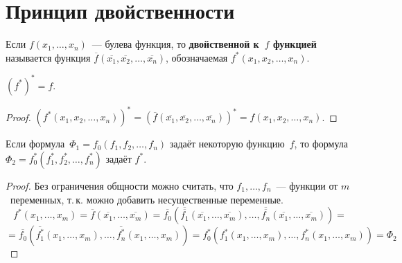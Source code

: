 \section{Принцип двойственности}
 Если $f(x_1, \ldots, x_n)$~--- булева функция, то \textbf{двойственной к~$f$ функцией} называется функция $\overline f(\overline{x_1}, \overline{x_2}, \ldots, \overline{x_n})$, обозначаемая $f^*(x_1, x_2, \ldots, x_n)$.

\begin{statement}
$(f^*)^* = f$.
\end{statement}
\begin{proof}
$(f^*(x_1, x_2, \ldots, x_n))^* =
(\overline f(\overline{x_1}, \overline{x_2}, \ldots, \overline{x_n}))^* =
f(x_1, x_2, \ldots, x_n)$.
\end{proof}

\begin{theorem}
Если формула~$\Phi_1 = f_0(f_1, f_2, \ldots, f_n)$ задаёт некоторую функцию~$f$, то формула~$\Phi_2 = f_0^*(f_1^*, f_2^*, \ldots, f_n^*)$ задаёт $f^*$.
\end{theorem}
\begin{proof}
Без ограничения общности можно считать, что $f_1, \ldots, f_n$~--- функции от $m$~переменных, т.\,к. можно добавить несущественные переменные.
\begin{equation*}
f^*(x_1, \ldots, x_m) =
\overline f(\overline{x_1}, \ldots, \overline{x_m}) =
\overline{f_0}(\overline{\overline{f_1}}(\overline{x_1}, \ldots, \overline{x_m}), \ldots, \overline{\overline{f_n}}(\overline{x_1}, \ldots, \overline{x_m})) =
\end{equation*}
\begin{equation*}
= \overline{f_0}(\overline{f_1^*}(x_1, \ldots, x_m), \ldots, \overline{f_n^*}(x_1, \ldots, x_m)) =
f_0^*(f_1^*(x_1, \ldots, x_m), \ldots, f_n^*(x_1, \ldots, x_m)) =
\Phi_2
\end{equation*}
\end{proof}